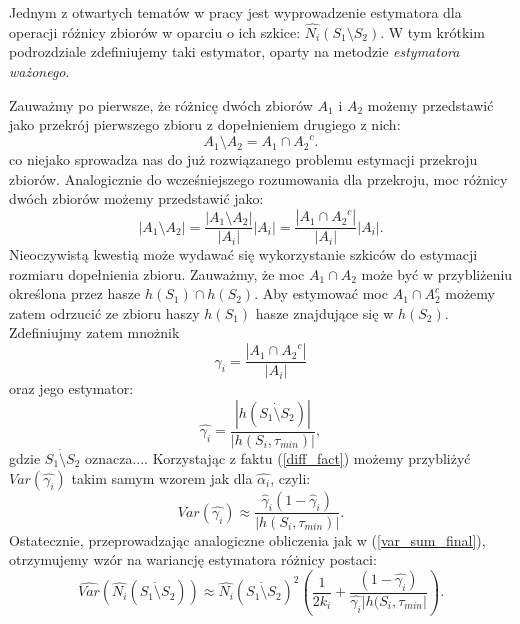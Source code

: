 Jednym z otwartych tematów w pracy \cite{ting} jest wyprowadzenie estymatora dla operacji różnicy zbiorów w oparciu o ich szkice: $\hat{N_i}(S_1 \setminus S_2)$. W tym krótkim podrozdziale zdefiniujemy taki estymator, oparty na metodzie \textit{estymatora ważonego}.

Zauważmy po pierwsze, że różnicę dwóch zbiorów $A_1$ i $A_2$ możemy przedstawić jako przekrój pierwszego zbioru z dopełnieniem drugiego z nich:
\begin{equation}
    A_1 \setminus A_2 = A_1 \cap {A_2}^{c}.
\end{equation}
co niejako sprowadza nas do już rozwiązanego problemu estymacji przekroju zbiorów.
Analogicznie do wcześniejszego rozumowania  dla przekroju, moc różnicy dwóch zbiorów możemy przedstawić jako:
\begin{equation}
    |A_1 \setminus A_2| = \frac{|A_1 \setminus A_2|}{|A_i|}|A_i| = \frac{|A_1 \cap {A_2}^{c}|}{|A_i|}|A_i|.
    \label{diff_fact}
\end{equation}
Nieoczywistą kwestią może wydawać się wykorzystanie szkiców do estymacji rozmiaru dopełnienia zbioru.
Zauważmy, że moc $A_1 \cap A_2$ może być w przybliżeniu określona przez hasze $h(S_1) \cap h(S_2)$.
Aby estymować moc  $A_1 \cap A_2^c$ możemy zatem odrzucić ze zbioru haszy $h(S_1)$ hasze znajdujące się w $h(S_2)$.
Zdefiniujmy zatem mnożnik $${\gamma}_{i} = \frac{|A_1 \cap {A_2}^{c}|}{|A_i|}$$
oraz jego estymator:
\begin{equation}
    \hat{{\gamma}_i} = \frac{|h(S_1 \dot{\setminus} S_2)|}{|h(S_i, {\tau}_{min})|},
\end{equation}
gdzie $S_1 \dot{\setminus} S_2$ oznacza....
 Korzystając z faktu (\ref{diff_fact})
możemy przybliżyć $Var(\hat{{\gamma}_i})$ takim samym wzorem jak dla $\hat{{\alpha}_i}$, czyli:
\begin{equation}
    Var(\hat{{\gamma}_i}) \approx \frac{{\hat{\gamma}}_i(1 - {\hat{\gamma}}_i)}{|h(S_i, {\tau}_{min})|}.
\end{equation}
Ostatecznie, przeprowadzając analogiczne obliczenia jak w (\ref{var_sum_final}),
 otrzymujemy wzór na wariancję estymatora różnicy postaci:
\begin{equation}
    \hat{Var}(\hat{N_i}(S_1 \dot{\setminus} S_2)) \approx \hat{N_i}(S_1 \dot{\setminus} S_2)^{2}(\frac{1}{2{k}_i} + \frac{(1 - \hat{{\gamma}_i})}{\hat{{\gamma}_i}|h(S_i, {\tau}_{min}|}).
\end{equation}


